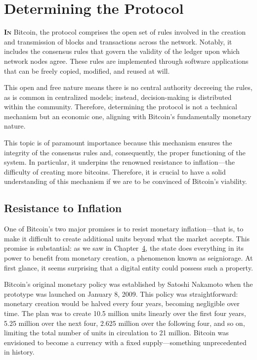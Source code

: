 \documentclass[
  a5paper,
  smalldemyvopaper,10pt,twoside,onecolumn,openright,extrafontsizes,hidelinks]{memoir}
\begin{document}

\chapter{Determining the Protocol}\label{ch:determination}

\label{enotezch:11}{}

\textbf{{I}\textsc{n}} Bitcoin, the protocol comprises the open set of
rules involved in the creation and transmission of blocks and
transactions across the network. Notably, it includes the consensus
rules that govern the validity of the ledger upon which network nodes
agree. These rules are implemented through software applications that
can be freely copied, modified, and reused at will.

This open and free nature means there is no central authority decreeing
the rules, as is common in centralized models; instead, decision-making
is distributed within the community. Therefore, determining the protocol
is not a technical mechanism but an economic one, aligning with
Bitcoin's fundamentally monetary nature.

This topic is of paramount importance because this mechanism ensures the
integrity of the consensus rules and, consequently, the proper
functioning of the system. In particular, it underpins the renowned
resistance to inflation---the difficulty of creating more bitcoins.
Therefore, it is crucial to have a solid understanding of this mechanism
if we are to be convinced of Bitcoin's viability.

\section*{Resistance to Inflation}\label{resistance-to-inflation}


One of Bitcoin's two major promises is to resist monetary
inflation---that is, to make it difficult to create additional units
beyond what the market accepts. This promise is substantial: as we saw
in Chapter~\hyperref[ch:adversaire]{4}, the state does everything in its
power to benefit from monetary creation, a phenomenon known as
seigniorage. At first glance, it seems surprising that a digital entity
could possess such a property.

Bitcoin's original monetary policy was established by Satoshi Nakamoto
when the prototype was launched on January 8, 2009. This policy was
straightforward: monetary creation would be halved every four years,
becoming negligible over time. The plan was to create 10.5 million units
linearly over the first four years, 5.25 million over the next four,
2.625 million over the following four, and so on, limiting the total
number of units in circulation to 21 million. Bitcoin was envisioned to
become a currency with a fixed supply---something unprecedented in
history.
\end{document}
